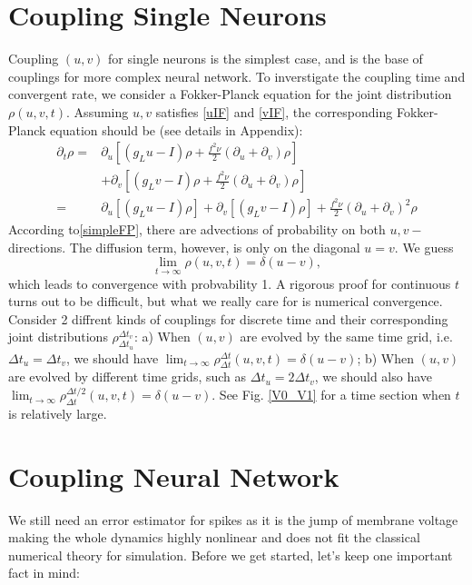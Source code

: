 \documentclass[10pt]{article}
\begin{document}
\begin{multicols}{2}
\section{Coupling Single Neurons}
Coupling $(u,v)$ for single neurons is the simplest case, and is the base of couplings for more complex neural network. To inverstigate the coupling time and convergent rate, we consider a Fokker-Planck equation for the joint distribution $\rho(u,v,t)$. Assuming $u,v$ satisfies \ref{uIF} and \ref{vIF}, the corresponding Fokker-Planck equation should be (see details in Appendix): 
\begin{subequations}
\begin{align}
\partial_t\rho =& \partial_{u}[(g_Lu-I)\rho+\frac{f^2\nu}{2}(\partial_{u}+\partial_{v})\rho]  \nonumber\\
                       &+ \partial_{v}[(g_Lv-I)\rho+\frac{f^2\nu}{2}(\partial_{u}+\partial_{v})\rho] \nonumber\\
                      =& \partial_{u}[(g_Lu-I)\rho]+ \partial_{v}[(g_Lv-I)\rho]+\frac{f^2\nu}{2}(\partial_{u}+\partial_{v})^2\rho \label{simpleFP}
\end{align}
\end{subequations}
\indent
According to\ref{simpleFP}, there are advections of probability on both $u,v-$directions. The diffusion term, however, is only on the diagonal $u=v$. We guess $$\lim_{t\to\infty}\rho(u,v,t) = \delta(u-v),$$which leads to convergence with probvability 1. A rigorous proof for continuous $t$ turns out to be difficult, but what we really care for is numerical convergence. Consider 2 diffrent kinds of couplings for discrete time and their corresponding joint distributions $\rho_{\Delta t_u}^{\Delta t_v}$: a) When $(u,v)$ are evolved by the same time grid, i.e. $\Delta t_u=\Delta t_v$, we should have $\lim_{t\to\infty}\rho_{\Delta t}^{\Delta t}(u,v,t)= \delta(u-v)$; b) When $(u,v)$ are evolved by different time grids, such as $\Delta t_u=2\Delta t_v$, we should also have $\lim_{t\to\infty}\rho_{\Delta t}^{\Delta t/2}(u,v,t)= \delta(u-v)$. See Fig. \ref{V0_V1} for a time section when $t$ is relatively large.



\section{Coupling Neural Network}
\noindent
We still need an error estimator for spikes as it is the jump of membrane voltage making the whole dynamics highly nonlinear and does not fit the classical numerical theory for simulation. Before we get started, let's keep one important fact in mind:

\end{multicols}
\end{document}
